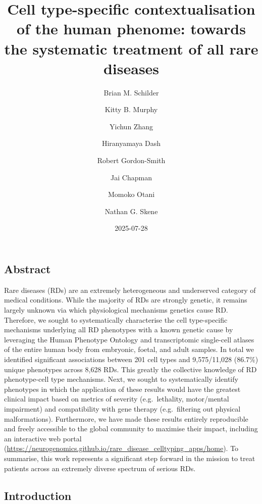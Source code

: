 \documentclass[
]{article}
\title{Cell type-specific contextualisation of the human phenome:
towards the systematic treatment of all rare diseases}
\author{Brian M. Schilder \and Kitty B. Murphy \and Yichun
Zhang \and Hiranyamaya Dash \and Robert Gordon-Smith \and Jai
Chapman \and Momoko Otani \and Nathan G. Skene}
\date{2025-07-28}
\begin{document}
\maketitle


\newpage{}

\subsection{Abstract}\label{abstract}

Rare diseases (RDs) are an extremely heterogeneous and underserved
category of medical conditions. While the majority of RDs are strongly
genetic, it remains largely unknown via which physiological mechanisms
genetics cause RD. Therefore, we sought to systematically characterise
the cell type-specific mechanisms underlying all RD phenotypes with a
known genetic cause by leveraging the Human Phenotype Ontology and
transcriptomic single-cell atlases of the entire human body from
embryonic, foetal, and adult samples. In total we identified significant
associations between 201 cell types and 9,575/11,028 (86.7\%) unique
phenotypes across 8,628 RDs. This greatly the collective knowledge of RD
phenotype-cell type mechanisms. Next, we sought to systematically
identify phenotypes in which the application of these results would have
the greatest clinical impact based on metrics of severity
(e.g.~lethality, motor/mental impairment) and compatibility with gene
therapy (e.g.~filtering out physical malformations). Furthermore, we
have made these results entirely reproducible and freely accessible to
the global community to maximise their impact, including an interactive
web portal
(\url{https://neurogenomics.github.io/rare_disease_celltyping_apps/home}).
To summarise, this work represents a significant step forward in the
mission to treat patients across an extremely diverse spectrum of
serious RDs.

\subsection{Introduction}\label{sec-introduction}
\end{document}
